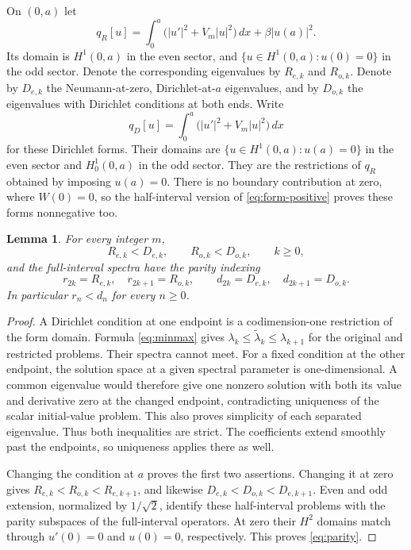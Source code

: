 \documentclass[11pt]{article}
\newtheorem{lemma}[theorem]{Lemma}
\begin{document}
On $(0,a)$ let
\[
 q_R[u]=\int_0^a\bigl(|u'|^2+V_m|u|^2\bigr)\,dx+\beta|u(a)|^2.
\]
Its domain is $H^1(0,a)$ in the even sector, and
$\{u\in H^1(0,a):u(0)=0\}$ in the odd sector. Denote the corresponding
eigenvalues by $R_{e,k}$ and $R_{o,k}$. Denote by $D_{e,k}$ the
Neumann-at-zero, Dirichlet-at-$a$ eigenvalues, and by $D_{o,k}$ the
eigenvalues with Dirichlet conditions at both ends. Write
\[
 q_D[u]=\int_0^a\bigl(|u'|^2+V_m|u|^2\bigr)\,dx
\]
for these Dirichlet forms. Their domains are
$\{u\in H^1(0,a):u(a)=0\}$ in the even sector and $H^1_0(0,a)$ in the
odd sector. They are the restrictions of $q_R$ obtained by imposing
$u(a)=0$. There is no
boundary contribution at zero, where $W(0)=0$, so the half-interval
version of \eqref{eq:form-positive} proves these forms nonnegative too.

\begin{lemma}\label{lem:endpoints}
For every integer $m$,
\[
 R_{e,k}<D_{e,k},\qquad R_{o,k}<D_{o,k},\qquad k\geq0,
\]
and the full-interval spectra have the parity indexing
\begin{equation}\label{eq:parity}
 r_{2k}=R_{e,k},\quad r_{2k+1}=R_{o,k},\qquad
 d_{2k}=D_{e,k},\quad d_{2k+1}=D_{o,k}.
\end{equation}
In particular $r_n<d_n$ for every $n\geq0$.
\end{lemma}

\begin{proof}
A Dirichlet condition at one endpoint is a codimension-one restriction
of the form domain. Formula \eqref{eq:minmax} gives
$\lambda_k\leq\widetilde\lambda_k\leq\lambda_{k+1}$ for the original
and restricted problems. Their spectra cannot meet. For a fixed
condition at the other endpoint, the solution space at a given spectral
parameter is one-dimensional. A common eigenvalue would therefore give
one nonzero solution with both its value and derivative zero at the
changed endpoint, contradicting uniqueness of the scalar initial-value
problem. This also proves simplicity of each separated eigenvalue.
Thus both inequalities are strict. The coefficients extend smoothly
past the endpoints, so uniqueness applies there as well.

Changing the condition at $a$ proves the first two assertions. Changing
it at zero gives
$R_{e,k}<R_{o,k}<R_{e,k+1}$, and likewise
$D_{e,k}<D_{o,k}<D_{e,k+1}$. Even and odd extension, normalized by
$1/\sqrt2$, identify these half-interval problems with the parity
subspaces of the full-interval operators. At zero their $H^2$ domains
match through $u'(0)=0$ and $u(0)=0$, respectively. This proves
\eqref{eq:parity}.
\end{proof}
\end{document}
